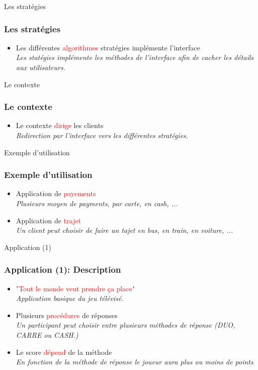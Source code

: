 \documentclass{beamer}
\begin{document}
  \begin{frame}{Les stratégies}
    \frametitle{Les stratégies}
    \begin{itemize}
      \item Les différentes \textcolor{red}{algorithmes} stratégies  implémente l'interface \\
      \textit{Les statégies implémente les méthodes de l'interface afin de cacher les détails aux utilisateurs.}
    \end{itemize}
    
  \end{frame}

  \begin{frame}{Le contexte}
    \frametitle{Le contexte}
    \begin{itemize}
      \item Le contexte \textcolor{red}{dirige} les clients \\
      \textit{Redirection par l'interface vers les différentes stratégies.}
    \end{itemize}
    
  \end{frame}
  
    \begin{frame}{Exemple d'utilisation}
    \frametitle{Exemple d'utilisation}
    \begin{itemize}
      \item Application de \textcolor{red}{payements} \\
      \textit{Plusieurs moyen de payments, par carte, en cash, ...}
      \item Application de \textcolor{red}{trajet} \\
      \textit{Un client peut choisir de faire un tajet en bus, en train, en voiture, ...}
    \end{itemize}
  \end{frame}

    \begin{frame}{Application (1)}
    \frametitle{Application (1): Description}
    \begin{itemize}
      \item \textcolor{red}{"Tout le monde veut prendre ça place"} \\
      \textit{Application basique du jeu télévisé.}
      \item Plusieurs \textcolor{red}{procédures} de réponses \\
      \textit{Un participant peut choisir entre plusieurs méthodes de réponse (DUO, CARRE ou CASH.)}
        \item Le score \textcolor{red}{dépend} de la méthode \\
      \textit{En fonction de la méthode de réponse le joueur aura plus ou moins de points}
    \end{itemize}
  \end{frame}
\end{document}
